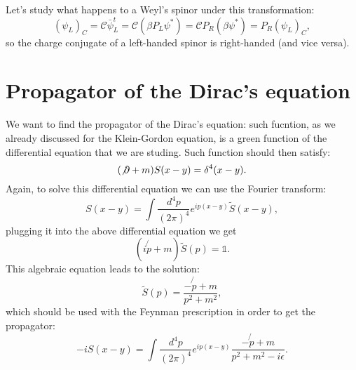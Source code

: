 Let's study what happens to a Weyl's spinor under this transformation:
\begin{equation*}
    (\psi_L)_C=\mathcal{C} \bar\psi_L^t=\mathcal{C} (\beta P_L\psi^*)=\mathcal{C} P_R(\beta \psi^*)=P_R(\psi_L)_C,
\end{equation*}
so the charge conjugate of a left-handed spinor is right-handed (and vice versa).
\section{Propagator of the Dirac's equation}
We want to find the propagator of the Dirac's equation: such fucntion, as we already discussed for the Klein-Gordon equation, is a green function of the differential equation that we are studing. Such function should then satisfy:
\begin{equation*}
    (\not\partial+m)S(x-y)=\delta^4(x-y).
\end{equation*} 
Again, to solve this differential equation we can use the Fourier transform:
\begin{equation*}
    S(x-y)=\int\frac{d^4p}{(2\pi)^4}e^{ip(x-y)}\tilde{S}(x-y),
\end{equation*}
plugging it into the above differential equation we get
\begin{equation*}
    (i\not{p}+m)\tilde{S}(p)=\mathds{1}.
\end{equation*}
This algebraic equation leads to the solution:
\begin{equation*}
    \tilde{S}(p)=\frac{-\not{p}+m}{p^2+m^2},
\end{equation*}
which should be used with the Feynman prescription in order to get the propagator:
\begin{equation*}
    -iS(x-y)=\int\frac{d^4p}{(2\pi)^4}e^{ip(x-y)}\frac{-\not{p}+m}{p^2+m^2-i\epsilon}.
\end{equation*}  
